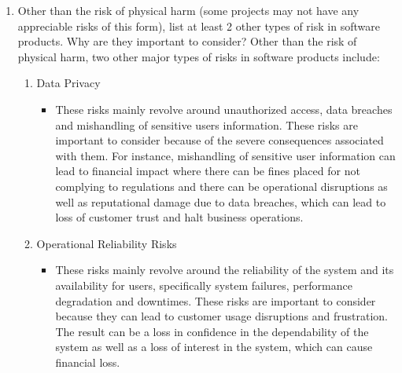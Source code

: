 \documentclass{article}
\begin{document}
\begin{enumerate}
    \item Other than the risk of physical harm (some projects may not have any
    appreciable risks of this form), list at least 2 other types of risk in
    software products. Why are they important to consider?
    Other than the risk of physical harm, two other major types of risks in software products include:
    \begin{enumerate}
        \item Data Privacy
        \begin{itemize}
            \item These risks mainly revolve around unauthorized access, data breaches and mishandling of sensitive users information. These risks are important to consider because of the severe consequences associated with them. For instance, mishandling of sensitive user information can lead to financial impact where there can be fines placed for not complying to regulations and there can be operational disruptions as well as reputational damage due to data breaches, which can lead to loss of customer trust and halt business operations.
        \end{itemize}
        \item Operational Reliability Risks
        \begin{itemize}
            \item These risks mainly revolve around the reliability of the system and its availability for users, specifically system failures, performance degradation and downtimes. These risks are important to consider because they can lead to customer usage disruptions and frustration. The result can be a loss in confidence in the dependability of the system as well as a loss of interest in the system, which can cause financial loss.
        \end{itemize}
    \end{enumerate}
    
\end{enumerate}
\end{document}

